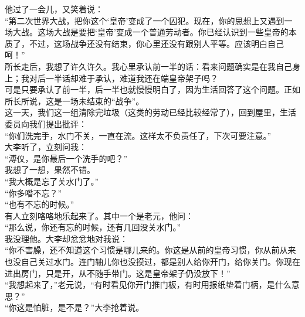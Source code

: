 他过了一会儿，又笑着说：\\

“第二次世界大战，把你这个‘皇帝’变成了一个囚犯。现在，你的思想上又遇到一场大战。这场大战是要把‘皇帝’变成一个普通劳动者。你已经认识到一些皇帝的本质了，不过，这场战争还没有结束，你心里还没有跟别人平等。应该明白自己呵！”\\

所长走后，我想了许久许久。我心里承认前一半的话：看来问题确实是在我自己身上；我对后一半话却难于承认，难道我还在端皇帝架子吗？\\

可是只要承认了前一半，后一半也就慢慢明白了，因为生活回答了这个问题。正如所长所说，这是一场未结束的“战争”。\\

这一天，我们这一组清除完垃圾（这类的劳动已经比较经常了），回到屋里，生活委员向我们提出批评：\\

“你们洗完手，水门不关，一直在流。这样太不负责任了，下次可要注意。”\\

大李听了，立刻问我：\\

“溥仪，是你最后一个洗手的吧？”\\

我想了一想，果然不错。\\

“我大概是忘了关水门了。”\\

“你多喒不忘？”\\

“也有不忘的时候。”\\

有人立刻咯咯地乐起来了。其中一个是老元，他问：\\

“那么说，你还有忘的时候，还有几回没关水门。”\\

我没理他。大李却忿忿地对我说：\\

“你不害臊，还不知道这个习惯是哪儿来的。你这是从前的皇帝习惯，你从前从来也没自己关过水门。连门轴儿你也没摸过，都是别人给你开门，给你关门。你现在进出房门，只是开，从不随手带门。这是皇帝架子仍没放下！”\\

“我想起来了，”老元说，“有时看见你开门推门板，有时用报纸垫着门柄，是什么意思？”\\

“你这是怕脏，是不是？”大李抢着说。\\

